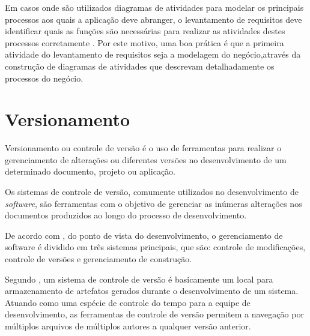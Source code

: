 Em casos onde são utilizados diagramas de atividades para modelar os principais processos aos quais a aplicação deve abranger, o levantamento de requisitos deve identificar quais as funções são necessárias para realizar as atividades destes processos corretamente \cite{wazlawick2013engenharia}. Por este motivo, uma boa prática é que a primeira atividade do levantamento de requisitos seja a modelagem do negócio,através da construção de diagramas de atividades que descrevam detalhadamente os processos do negócio.

\section{Versionamento}

Versionamento ou controle de versão é o uso de ferramentas para realizar o gerenciamento de alterações ou diferentes versões no desenvolvimento de um determinado documento, projeto ou aplicação.

Os sistemas de controle de versão, comumente utilizados no desenvolvimento de \textit{software}, são ferramentas com o objetivo de gerenciar as inúmeras alterações nos documentos produzidos ao longo do processo de desenvolvimento.

De acordo com \cite{murta2006gerencia}, do ponto de vista do desenvolvimento, o gerenciamento de software é dividido em três sistemas principais, que são: controle de modificações, controle de versões e gerenciamento de construção.

Segundo \cite{mason2006pragmatic}, um sistema de controle de versão é basicamente um local para armazenamento de artefatos gerados durante o desenvolvimento de um sistema. Atuando como uma espécie de controle do tempo para a equipe de desenvolvimento, as ferramentas de controle de versão permitem a navegação por múltiplos arquivos de múltiplos autores a qualquer versão anterior.

